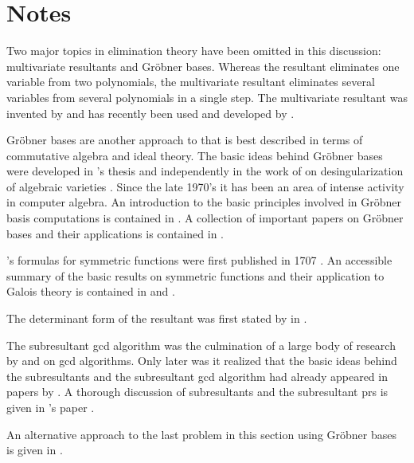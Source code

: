 \section*{Notes}

\small

Two major topics in elimination theory have been omitted in this 
discussion: multivariate resultants and 
Gr\"{o}bner bases.  Whereas
the resultant eliminates one variable from two polynomials, the
multivariate resultant eliminates several variables from several
polynomials in a single step.  The multivariate resultant was invented by
{\Macaulay} \cite{Macaulay02,Macaulay16,Macaulay21} and has recently
been used and developed by {\Canny} \cite{Canny87,Manocha91,Manocha93}.

Gr\"{o}bner bases are another approach to  that is
best described in terms of commutative algebra and ideal theory.  The
basic ideas behind Gr\"{o}bner bases were developed in
{\Buchberger}'s thesis \cite{Buchberger70} and independently in the
work of {\Hironaka} on desingularization of algebraic varieties
\cite{Hironaka64}.  Since the late 1970's it has been an area of
intense activity in computer algebra.  An introduction to the basic
principles involved in Gr\"{o}bner basis computations is contained in
\cite{Buchberger85}.  A collection of important papers on
Gr\"{o}bner bases and their applications is contained in
\cite{Robbiano89}.

  {\Newton}'s formulas for symmetric
functions were first published in 1707 \cite{Newton07}.  An accessible
summary of the basic results on symmetric functions and their
application to Galois theory is contained in {\Netto}
\cite{Netto:Substitutions} and {\JordanC} \cite{Jordan70}.

 The determinant form of the resultant
was first stated by {\Sylvester} in \cite{Sylvester53}.

 The subresultant {\sc gcd} algorithm
was the culmination of a large body of research by {\BrownWS} and
{\Collins} on {\sc gcd} algorithms.  Only later was it realized that the
basic ideas behind the subresultants and the subresultant {\sc gcd}
algorithm had already appeared in papers by {\Habicht}
\cite{Habicht48a,Habicht48b}.   A thorough discussion of subresultants
and the subresultant {\sc prs} is given in {\Loos}'s paper
\cite{Loos82}.

  An alternative approach to the last 
problem in this section using Gr\"{o}bner bases is given in
\cite{Shannon89}. 

\normalsize


